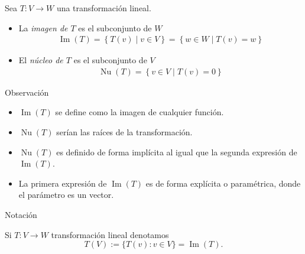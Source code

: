 \documentclass[handout]{beamer} %
\newcommand{\img}{\operatorname{Im}}
\newcommand{\im}{\operatorname{Im}}
\renewcommand\nu{\operatorname{Nu}}
\begin{document}
\begin{frame}
\begin{definicion}
Sea $T:V\longrightarrow W$ una transformación lineal.
\begin{itemize}\pause
\item La \textit{imagen de $T$} es el subconjunto de $W$
 \begin{align*}
 \img(T)=\left\{T(v)\mid v\in V\right\}=\left\{w\in W\mid T(v)=w\right\}
 \end{align*}\pause
 \item El \textit{núcleo de $T$} es el subconjunto de $V$
 \begin{align*}
 \nu(T)=\left\{v\in V\mid T(v)=0\right\}
 \end{align*}
\end{itemize}
\end{definicion}
\end{frame}

\begin{frame}

\begin{block}{Observación}
\begin{itemize}\pause
\item $\img(T)$ se define como la imagen de cualquier función. \pause

\item $\nu(T)$ serían las raíces de la transformación. \pause

\item $\nu(T)$ es definido de forma implícita al igual que la segunda expresión de $\img(T)$. \pause

\item La primera expresión de $\img(T)$ es de forma explícita o paramétrica, donde el parámetro es un vector.

\end{itemize}

\begin{block}{Notación}

    Si $T : V \to W$ transformación lineal denotamos
$$
          T(V) := \{T(v): v \in V \} = \im(T).
$$
    
\end{block}
 
\end{block}

\end{frame}

\end{document}

